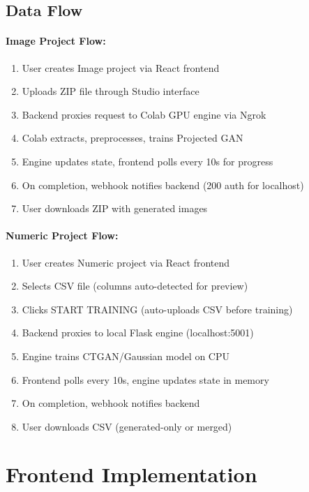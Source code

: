\documentclass[11pt,a4paper]{article}
\begin{document}
\subsection{Data Flow}
\paragraph{Image Project Flow:}
\begin{enumerate}[noitemsep]
    \item User creates Image project via React frontend
    \item Uploads ZIP file through Studio interface
    \item Backend proxies request to Colab GPU engine via Ngrok
    \item Colab extracts, preprocesses, trains Projected GAN
    \item Engine updates state, frontend polls every 10s for progress
    \item On completion, webhook notifies backend (200 auth for localhost)
    \item User downloads ZIP with generated images
\end{enumerate}

\paragraph{Numeric Project Flow:}
\begin{enumerate}[noitemsep]
    \item User creates Numeric project via React frontend
    \item Selects CSV file (columns auto-detected for preview)
    \item Clicks START TRAINING (auto-uploads CSV before training)
    \item Backend proxies to local Flask engine (localhost:5001)
    \item Engine trains CTGAN/Gaussian model on CPU
    \item Frontend polls every 10s, engine updates state in memory
    \item On completion, webhook notifies backend
    \item User downloads CSV (generated-only or merged)
\end{enumerate}

\section{Frontend Implementation}
\end{document}
